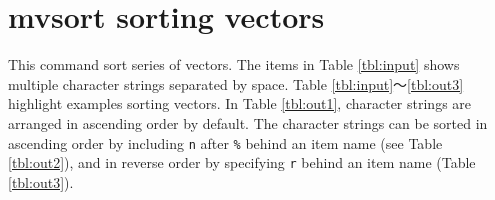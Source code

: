 \documentclass[a4paper]{jarticle}
\begin{document}
\renewcommand{\tablename}{Table }

\setlength{\baselineskip}{4mm}

\section*{mvsort sorting vectors }
This command sort series of vectors. 
The items in Table \ref{tbl:input} shows multiple character strings separated by space. 
Table \ref{tbl:input}〜\ref{tbl:out3} highlight examples sorting vectors. In Table  \ref{tbl:out1}, character strings are arranged in ascending order by default. The character strings can be sorted in ascending order by including \verb|n| after \verb|%| behind an item name (see Table \ref{tbl:out2}), and in reverse order by specifying \verb|r| behind an item name (Table \ref{tbl:out3}).  
\end{document}
